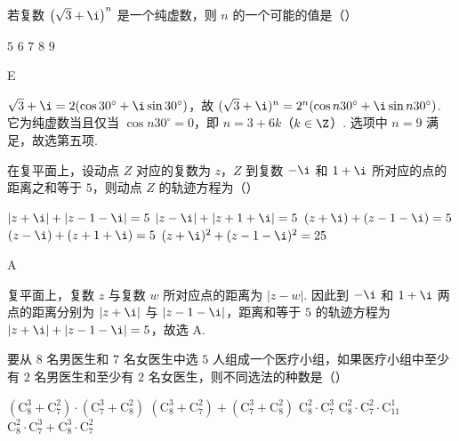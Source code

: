 \documentclass[UTF8,a4paper,oneside,11pt]{ctexbook}
\begin{document}
\begin{problem}

若复数 \(\left(\sqrt{3} + \i\right)^{n} \) 是一个纯虚数，则 \(n\) 的一个可能的值是（\quad）

\choicesfive
    {\(5\)}
    {\(6\)}
    {\(7\)}
    {\(8\)}
    {\(9\)}
\end{problem}

\begin{answer}
E
\end{answer}

\begin{solution}
\(\sqrt{3}+\i=2(\cos30^{\circ}+\i\sin30^{\circ})\)，故 \((\sqrt{3}+\i)^n=2^n(\cos n30^{\circ}+\i\sin n30^{\circ})\). 它为纯虚数当且仅当 \(\cos n30^{\circ}=0\)，即 \(n=3+6k\)（\(k\in\Z\)）. 选项中 \(n=9\) 满足，故选第五项.
\end{solution}

\begin{problem}

在复平面上，设动点 \(Z\) 对应的复数为 \(z\)，\(Z\) 到复数 \(-\i\) 和 \(1+\i \) 所对应的点的距离之和等于 \(5\)，则动点 \(Z\) 的轨迹方程为（\quad）

\choicesfive
    {\(\left|z+\i\right|+\left|z-1-\i\right|=5 \)}
    {\(\left|z-\i\right|+\left|z+1+\i\right|=5 \)}
    {\((z+\i)+(z-1-\i)=5 \)}
    {\((z-\i)+(z+1+\i)=5 \)}
    {\((z + \i)^{2} + (z - 1 - \i)^{2} = 25 \)}
\end{problem}

\begin{answer}
A
\end{answer}

\begin{solution}
复平面上，复数 \(z\) 与复数 \(w\) 所对应点的距离为 \(|z-w|\). 因此到 \(-\i\) 和 \(1+\i\) 两点的距离分别为 \(|z+\i|\) 与 \(|z-1-\i|\)，距离和等于 \(5\) 的轨迹方程为 \(|z+\i|+|z-1-\i|=5\)，故选 A.
\end{solution}

\begin{problem}

要从 \(8\) 名男医生和 \(7\) 名女医生中选 \(5\) 人组成一个医疗小组，如果医疗小组中至少有 \(2\) 名男医生和至少有 \(2\) 名女医生，则不同选法的种数是（\quad）

\choicesfive
    {\((\mathrm C_8^3 + \mathrm C_7^2)\cdot (\mathrm C_7^3 + \mathrm C_8^2) \)}
    {\((\mathrm C_8^3 + \mathrm C_7^2) + (\mathrm C_7^3 + \mathrm C_8^2) \)}
    {\(\mathrm C_8^2\cdot \mathrm C_7^3 \)}
    {\(\mathrm C_8^2\cdot \mathrm C_7^2\cdot \mathrm C_11^1 \)}
    {\(\mathrm C_8^2\cdot \mathrm C_7^3 + \mathrm C_8^3\cdot \mathrm C_7^2\)}
\end{problem}
\end{document}
